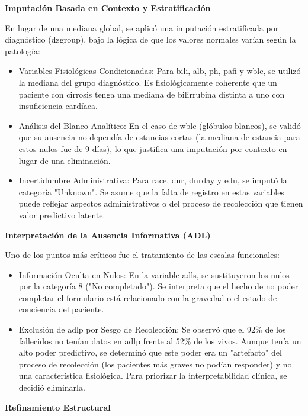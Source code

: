 \textbf{Imputación Basada en Contexto y Estratificación}

En lugar de una mediana global, se aplicó una imputación estratificada por
diagnóstico (dzgroup), bajo la lógica de que los valores normales varían según
la patología:

\begin{itemize}
  \item Variables Fisiológicas Condicionadas: Para bili, alb, ph, pafi y wblc, se
    utilizó la mediana del grupo diagnóstico. Es fisiológicamente coherente que
    un paciente con cirrosis tenga una mediana de bilirrubina distinta a uno con
    insuficiencia cardíaca.
  \item Análisis del Blanco Analítico: En el caso de wblc (glóbulos blancos), se
    validó que su ausencia no dependía de estancias cortas (la mediana de
    estancia para estos nulos fue de 9 días), lo que justifica una imputación
    por contexto en lugar de una eliminación.
  \item Incertidumbre Administrativa: Para race, dnr, dnrday y edu, se imputó la
    categoría "Unknown". Se asume que la falta de registro en estas variables
    puede reflejar aspectos administrativos o del proceso de recolección que
    tienen valor predictivo latente.
\end{itemize}

\textbf{Interpretación de la Ausencia Informativa (ADL)}

Uno de los puntos más críticos fue el tratamiento de las escalas funcionales:

\begin{itemize}
  \item Información Oculta en Nulos: En la variable adls, se sustituyeron los nulos
    por la categoría 8 ("No completado"). Se interpreta que el hecho de no poder
    completar el formulario está relacionado con la gravedad o el estado de
    conciencia del paciente.
  \item Exclusión de adlp por Sesgo de Recolección: Se observó que el 92\% de los
    fallecidos no tenían datos en adlp frente al 52\% de los vivos. Aunque tenía
    un alto poder predictivo, se determinó que este poder era un "artefacto" del
    proceso de recolección (los pacientes más graves no podían responder) y no
    una característica fisiológica. Para priorizar la interpretabilidad clínica,
    se decidió eliminarla.
\end{itemize}

\textbf{Refinamiento Estructural}

